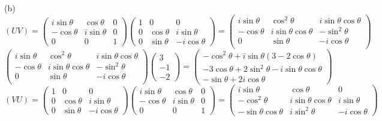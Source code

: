 \documentclass[a4paper]{article}
\begin{document}
(b)
\[
(UV)=\begin{pmatrix}
i\sin\theta&\cos\theta&0\\
-\cos\theta&i\sin\theta&0\\
0&0&1
\end{pmatrix}
\begin{pmatrix}
1&0&0\\
0&\cos\theta&i\sin\theta\\
0&\sin\theta&-i\cos\theta
\end{pmatrix}=
\begin{pmatrix}
i\sin\theta&\cos^2\theta&i\sin\theta\cos\theta\\
-\cos\theta&i\sin\theta\cos\theta&-\sin^2\theta\\
0&\sin\theta&-i\cos\theta\\
\end{pmatrix}
\]
\[
\begin{pmatrix}
i\sin\theta&\cos^2\theta&i\sin\theta\cos\theta\\
-\cos\theta&i\sin\theta\cos\theta&-\sin^2\theta\\
0&\sin\theta&-i\cos\theta\\
\end{pmatrix}
\begin{pmatrix}
3\\-1\\-2
\end{pmatrix}=
\begin{pmatrix}
-\cos^2\theta+i\sin\theta(3-2\cos\theta)\\
-3\cos\theta+2\sin^2\theta-i\sin\theta\cos\theta\\
-\sin\theta+2i\cos\theta
\end{pmatrix}
\]
\[
(VU)=
\begin{pmatrix}
1&0&0\\
0&\cos\theta&i\sin\theta\\
0&\sin\theta&-i\cos\theta
\end{pmatrix}
\begin{pmatrix}
i\sin\theta&\cos\theta&0\\
-\cos\theta&i\sin\theta&0\\
0&0&1
\end{pmatrix}=
\begin{pmatrix}
i\sin\theta&\cos\theta&0\\
-\cos^2\theta&i\sin\theta\cos\theta&i\sin\theta\\
-\sin\theta\cos\theta&i\sin^2\theta&-i\cos\theta
\end{pmatrix}
\]
\end{document}
